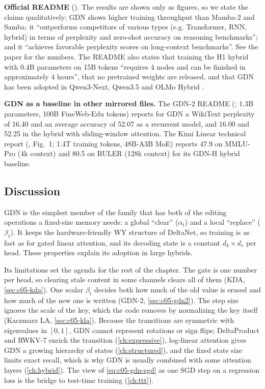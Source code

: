 \begin{results}
\textbf{Official README} (). The results are shown
only as figures, so we state the claims qualitatively: GDN shows higher training throughput than
Mamba-2 and Samba; it ``outperforms competitors of various types (e.g. Transformer, RNN, hybrid)
in terms of perplexity and zero-shot accuracy on reasoning benchmarks''; and it ``achieves
favorable perplexity scores on long-context benchmarks''. See the paper for the numbers. The README
also states that training the H1 hybrid with 0.4B parameters on 15B tokens ``requires 4 nodes and
can be finished in approximately 4 hours'', that no pretrained weights are released, and that GDN
has been adopted in Qwen3-Next, Qwen3.5 and OLMo Hybrid \citep{merrill2026olmohybrid}.

\textbf{GDN as a baseline in other mirrored files.} The GDN-2 README
(; 1.3B parameters, 100B FineWeb-Edu tokens)
reports for GDN a WikiText perplexity of 16.40 and an average accuracy of 52.07 as a recurrent
model, and 16.00 and 52.25 in the hybrid with sliding-window attention. The Kimi Linear technical
report (, Fig.~1; 1.4T training tokens,
48B-A3B MoE) reports 47.9 on MMLU-Pro (4k context) and 80.5 on RULER (128k context) for its
GDN-H hybrid baseline.
\end{results}

\subsection{Discussion}

GDN is the simplest member of the family that has both of the editing operations a fixed-size
memory needs: a global ``clear'' ($\alpha_t$) and a local ``replace'' ($\beta_t$). It keeps the
hardware-friendly WY structure of DeltaNet, so training is as fast as for gated linear attention,
and its decoding state is a constant $d_k\times d_v$ per head. These properties explain its
adoption in large hybrids.

Its limitations set the agenda for the rest of the chapter. The gate is one number per head, so
clearing stale content in some channels clears all of them (KDA, \cref{sec:c05-kda}). One scalar
$\beta_t$ decides both how much of the old value is erased and how much of the new one is written
(GDN-2, \cref{sec:c05-gdn2}). The step size ignores the scale of the key, which the code removes by
normalizing the key itself (Kaczmarz LA, \cref{sec:c05-kla}). Because the transitions are
symmetric with eigenvalues in $[0,1]$, GDN cannot represent rotations or sign flips; DeltaProduct
and RWKV-7 enrich the transition (\cref{ch:expressive}), log-linear attention gives GDN a growing
hierarchy of states (\cref{ch:structured}), and the fixed state size limits exact recall, which is
why GDN is usually combined with some attention layers (\cref{ch:hybrid}). The view of
\cref{eq:c05-gdn-sgd} as one SGD step on a regression loss is the bridge to test-time training
(\cref{ch:ttt}).

